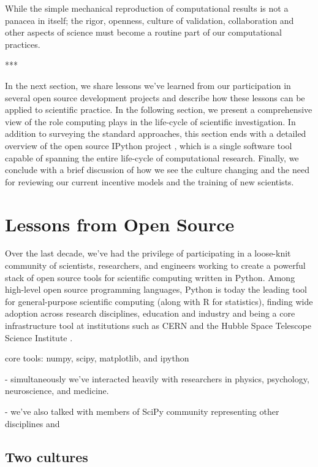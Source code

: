 \documentclass[ChapterTOCs,krantz2]{krantz} %
\newcommand{\parasep}{\begin{center}*\hspace{6em}*\hspace{6em}*\end{center}}
\begin{document}
While the simple mechanical reproduction of computational results is not a
panacea in itself; the rigor, openness, culture of validation, collaboration and
other aspects of science must become a routine part of our computational practices.

\parasep

In the next section, we share lessons we've learned from our participation in
several open source development projects and describe how these lessons can be
applied to scientific practice.  In the following section, we present a
comprehensive view of the role computing plays in the life-cycle of scientific
investigation.  In addition to surveying the standard approaches, this section
ends with a detailed overview of the open source IPython project
\cite{PER-GRA:2007}, which is a single software tool capable of spanning the
entire life-cycle of computational research.  Finally, we conclude with a brief
discussion of how we see the culture changing and the need for reviewing our
current incentive models and the training of new scientists.

\section{Lessons from Open Source}

Over the last decade, we've had the privilege of participating in a loose-knit
community of scientists, researchers, and engineers working to create a powerful
stack of open source tools for scientific computing written in Python.  Among
high-level open source programming languages, Python is today the leading tool
for general-purpose scientific computing (along with R for statistics),
finding wide adoption across research disciplines, education and industry and
being a core infrastructure tool at institutions such as CERN and the Hubble
Space Telescope Science Institute
\cite{millman2011python,Perez2011,ganga09,SST}.

core tools: numpy, scipy, matplotlib, and ipython

- simultaneously we've interacted heavily with researchers in
physics, psychology, neuroscience, and medicine.

- we've also talked with members of SciPy community representing
other disciplines and 


\subsection{Two cultures}
\end{document}
